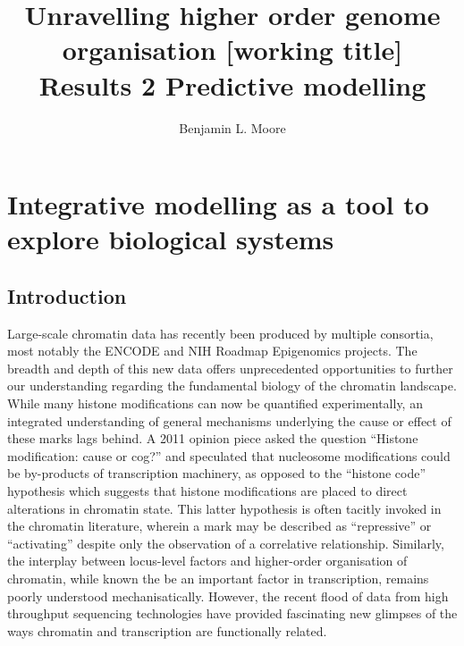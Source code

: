 \documentclass[a4paper,11pt,oneside]{book}
\title{ \vspace{3in} Unravelling higher order genome organisation {\small [working
    title]} \\ \vspace{2em} {\large {\bf Results 2} Predictive modelling } }
\author{Benjamin L. Moore}
\begin{document}
\maketitle

\chapter{Integrative modelling as a tool to explore biological systems}
\vspace{2em}

\section{Introduction}
Large-scale chromatin data has recently been produced by multiple
consortia, most notably the ENCODE\cite{Gerstein2012} and NIH
Roadmap Epigenomics\cite{Bernstein2010} projects. The breadth and depth of this new
data offers unprecedented opportunities to further our understanding
regarding the fundamental biology of the chromatin landscape. While many histone
modifications can now be quantified experimentally,\cite{Nikolov2012, Sajan2012, Ernst2011} an integrated
understanding of general mechanisms underlying the cause or effect of
these marks lags behind. A 2011 opinion piece asked
the question ``Histone modification: cause or
cog?''\cite{Henikoff2011} and speculated that nucleosome modifications
could be by-products of transcription machinery, as opposed to
the ``histone code'' hypothesis which suggests that histone
modifications are placed to direct alterations in chromatin
state. This latter hypothesis is often tacitly invoked in the
chromatin literature, wherein a mark may be described as
``repressive'' or ``activating'' despite only the observation of a
correlative relationship.\cite{Henikoff2011} Similarly, the interplay
between locus-level factors and higher-order organisation of
chromatin, while known the be an important factor in
transcription, remains poorly understood mechanisatically.\cite{Li2011} 
However, the recent flood of data from high throughput sequencing technologies have provided fascinating new glimpses of the ways chromatin and transcription are functionally related.\\
\end{document}

